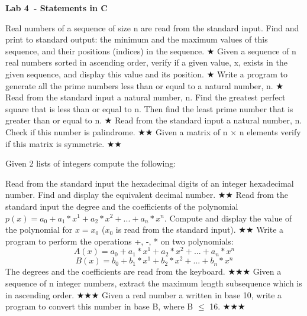 \documentclass{exam}
\newcommand\labnr{4}
\newcommand\lab{Lab \labnr\ - Statements in C}
\newcommand\lvlez{$\bigstar$}
\newcommand\lvlmed{\lvlez\lvlez}
\newcommand\lvlhard{\lvlmed\lvlez}
\begin{document}
\begin{center}
   \vspace*{0cm}
   \bfseries\LARGE
   \lab
   \vspace*{1cm}
\end{center}


\begin{questions}
   \question Real numbers of a sequence of size
   n are read from the standard input. Find and print to
   standard output: the minimum and the maximum values of this sequence, and their positions
   (indices) in the sequence. \lvlez
   \question Given a sequence of
n real numbers sorted in ascending order, verify if a given value,
x, exists in the given sequence, and display this value and its position. \lvlez
   \question Write a program to generate all the prime numbers less than or equal to a natural
   number,
   n. \lvlez
   \question Read from the standard input a natural number,
   n. Find the greatest perfect square
   that is less than or equal to
   n. Then find the least prime number that is greater than or equal to
   n. \lvlez
   \question Read from the standard input a natural number,
   n. Check if this number is palindrome. \lvlmed
   \question Given a matrix of
n $\times$ n elements verify if this matrix is symmetric. \lvlmed

   \question Given 2 lists of integers compute the following:
   \question Read from the standard input the hexadecimal digits of an integer hexadecimal number.
   Find and display the equivalent decimal number. \lvlmed
   \question Read from the standard input the degree and the coefficients of the polynomial $p(x)=a_0+a_1*x^1+a_2*x^2+...+a_n*x^n$.
   Compute and display the value of the polynomial for $x=x_0$ ($x_0$ is read from
   the standard input). \lvlmed
   \question  Write a program to perform the operations +, -, * on two polynomials:
   \[
      A(x) = a_0+a_1*x^1+a_2*x^2+...+a_n*x^n     \]
   \[
      B(x) = b_0+b_1*x^1+b_2*x^2+...+b_n*x^n
   \]
   The degrees and the coefficients are read from the keyboard. \lvlhard
   \question Given a sequence of
n integer numbers, extract the maximum length subsequence
which is in ascending order. \lvlhard
   \question Given a real number a written in base 10, write a program to convert this number in base B, where B $\leq$ 16. \lvlhard


\end{questions}
\end{document}
